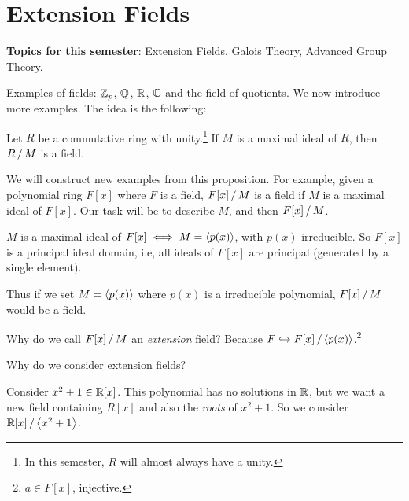 \setcounter{chapter}{5}

\chapter{Extension Fields}

\textbf{Topics for this semester}: Extension Fields, Galois Theory, Advanced Group Theory.

\setcounter{topic}{28}

Examples of fields: \(\mathbb{Z}_p\), \(\mathbb{Q}\), \(\mathbb{R}\), \(\mathbb{C}\) and the field of quotients. We now introduce more examples. The idea is the following:

\recall Let \(R\) be a commutative ring with unity.\footnote{In this semester, \(R\) will almost always have a unity.} If \(M\) is a maximal ideal of \(R\), then \(R \operatorname{/} M\) is a field.

We will construct new examples from this proposition. For example, given a polynomial ring \(F[x]\) where \(F\) is a field, \(F[x] \operatorname{/} M\) is a field if \(M\) is a maximal ideal of \(F[x]\). Our task will be to describe \(M\), and then \(F[x] \operatorname{/} M\).

\recall \(M\) is a maximal ideal of \(F[x] \iff M = \left\langle p(x) \right\rangle\), with \(p(x)\) irreducible. So \(F[x]\) is a principal ideal domain, i.e, all ideals of \(F[x]\) are principal (generated by a single element).

Thus if we set \(M = \left\langle p(x) \right\rangle\) where \(p(x)\) is a irreducible polynomial, \(F[x] \operatorname{/} M\) would be a field.

\question Why do we call \(F[x] \operatorname{/} M\) an \textit{extension} field? Because \(F \hookrightarrow {F[x]} \operatorname{/} {\left\langle p(x) \right\rangle}\).\footnote{\(a \in F[x]\), injective.}

\question Why do we consider extension fields?

Consider \(x^2 + 1 \in \mathbb{R}[x]\). This polynomial has no solutions in \(\mathbb{R}\), but we want a new field containing \(R[x]\) and also the \textit{roots} of \(x^2 + 1\). So we consider \(\mathbb{R}[x] \operatorname{/} \left\langle x^2 + 1 \right\rangle\).

\smallskip
